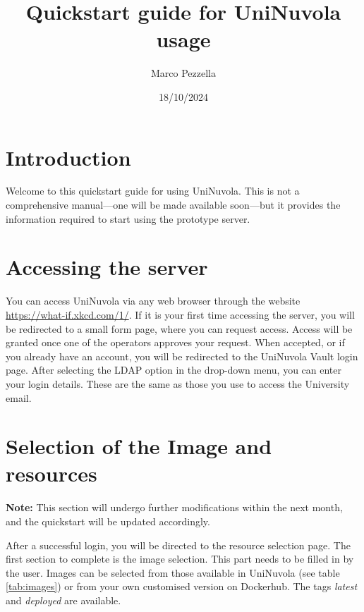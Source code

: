 \documentclass[a4paper,11pt]{article}
\begin{document}
\title{Quickstart guide for UniNuvola usage}
\author{Marco Pezzella}
\date{18/10/2024}

\maketitle

\section{Introduction}

Welcome to this quickstart guide for using UniNuvola. This is not a comprehensive manual—one will be made available soon—but it provides the information required to start using the prototype server.

\section{Accessing the server}

You can access UniNuvola via any web browser through the website \href{https://what-if.xkcd.com/1/}{https://what-if.xkcd.com/1/}. If it is your first time accessing the server, you will be redirected to a small form page, where you can request access. Access will be granted once one of the operators approves your request. When accepted, or if you already have an account, you will be redirected to the UniNuvola Vault login page. After selecting the LDAP option in the drop-down menu, you can enter your login details. These are the same as those you use to access the University email.

\section{Selection of the Image and resources}

\textbf{Note:} This section will undergo further modifications within the next month, and the quickstart will be updated accordingly.

After a successful login, you will be directed to the resource selection page. The first section to complete is the image selection. This part needs to be filled in by the user. Images can be selected from those available in UniNuvola (see table \ref{tab:images}) or from your own customised version on Dockerhub. The tags \textit{latest} and \textit{deployed} are available.\\
\end{document}
